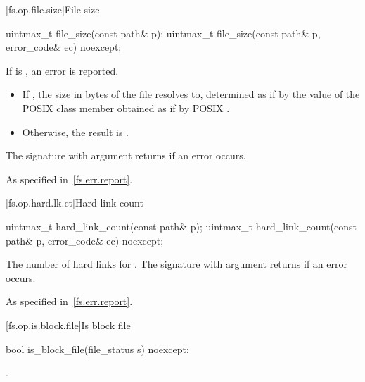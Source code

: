 [fs.op.file.size]{File size}

%
\begin{itemdecl}
uintmax_t file_size(const path& p);
uintmax_t file_size(const path& p, error_code& ec) noexcept;
\end{itemdecl}

\begin{itemdescr}
\pnum
\effects
If  is , an error is reported.

\pnum
\returns
\begin{itemize}
\item
  If , the size in bytes of the file
   resolves to, determined as if by the value of the POSIX 
  class member  obtained as if by POSIX .
\item
  Otherwise, the result is .
\end{itemize}
The signature with argument  returns 
if an error occurs.

\pnum
\throws
As specified in~\ref{fs.err.report}.
\end{itemdescr}


[fs.op.hard.lk.ct]{Hard link count}

%
\begin{itemdecl}
uintmax_t hard_link_count(const path& p);
uintmax_t hard_link_count(const path& p, error_code& ec) noexcept;
\end{itemdecl}

\begin{itemdescr}
\pnum
\returns
The number of hard links for . The signature
  with argument  returns 
  if an error occurs.

\pnum
\throws
As specified in~\ref{fs.err.report}.
\end{itemdescr}


[fs.op.is.block.file]{Is block file}

%
\begin{itemdecl}
bool is_block_file(file_status s) noexcept;
\end{itemdecl}

\begin{itemdescr}
\pnum
\returns
{}.
\end{itemdescr}


